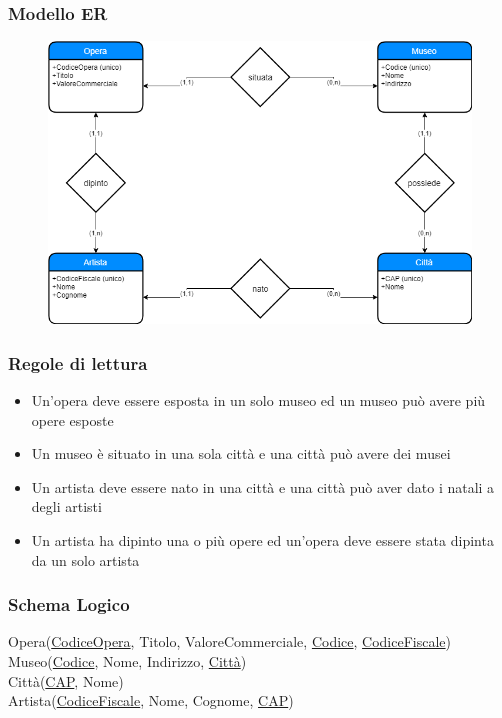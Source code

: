 \documentclass{article}
\begin{document}
	\subsubsection{Modello ER}
	\begin{figure}[h!]
		\centering
		\includegraphics[scale=0.5]{images/Opera.png}
	\end{figure}
	\subsubsection{Regole di lettura}
	\begin{itemize}
		\item Un'opera deve essere esposta in un solo museo ed un museo può avere più opere esposte
		\item Un museo è situato in una sola città e una città può avere dei musei
		\item Un artista deve essere nato in una città e una città può aver dato i natali a degli artisti
		\item Un artista ha dipinto una o più opere ed un'opera deve essere stata dipinta da un solo artista
	\end{itemize}
	\subsubsection{Schema Logico}
	Opera(\underline{CodiceOpera}, Titolo, ValoreCommerciale, \underline{Codice}, \underline{CodiceFiscale})\\
	Museo(\underline{Codice}, Nome, Indirizzo, \underline{Città})\\
	Città(\underline{CAP}, Nome)\\
	Artista(\underline{CodiceFiscale}, Nome, Cognome, \underline{CAP})
\end{document}
